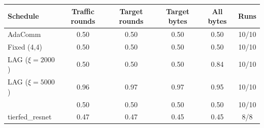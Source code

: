 \begin{tabular}{@{}lccccc@{}}
\toprule
Schedule & Traffic rounds & Target rounds & Target bytes & All bytes & Runs\\
\midrule
AdaComm & 0.50 & 0.50 & 0.50 & 0.50 & 10/10\\
Fixed (4,4) & 0.50 & 0.50 & 0.50 & 0.50 & 10/10\\
LAG ($\xi=2000$) & 0.50 & 0.50 & 0.50 & 0.84 & 10/10\\
LAG ($\xi=5000$) & 0.96 & 0.97 & 0.97 & 0.95 & 10/10\\
\tierfed{} & 0.50 & 0.50 & 0.50 & 0.50 & 10/10\\
tierfed_resnet & 0.47 & 0.47 & 0.45 & 0.45 & 8/8\\
\bottomrule
\end{tabular}
